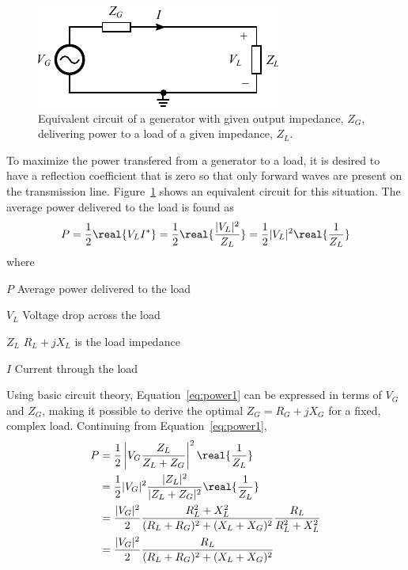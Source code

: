 \begin{figure}[htbp]
    \centering
    \includegraphics{img/analysis/generator_load}
    \caption{Equivalent circuit of a generator with given output impedance, $Z_G$, delivering power to a load of a given impedance, $Z_L$.}
    \label{fig:generator_load}
\end{figure}

To maximize the power transfered from a generator to a load, it is desired to have a reflection coefficient that is zero so that only forward waves are present on the transmission line. Figure~\ref{fig:generator_load} shows an equivalent circuit for this situation. The average power delivered to the load is found as \cite{pozar2011microwave}
\begin{equation}
    \label{eq:power1}
    P = \frac{1}{2} \real{V_LI^*} = \frac{1}{2} \real{\frac{|V_L|^2}{Z_L}}
    = \frac{1}{2} |V_L|^2 \real{\frac{1}{Z_L}}
\end{equation}
where
\begin{where}
\item[$P$] Average power delivered to the load
\item[$V_L$] Voltage drop across the load
\item[$Z_L$] $R_L+jX_L$ is the load impedance
\item[$I$] Current through the load
\end{where}
Using basic circuit theory, Equation~\ref{eq:power1} can be expressed in terms of $V_G$ and $Z_G$, making it possible to derive the optimal $Z_G = R_G+jX_G$ for a fixed, complex load. Continuing from Equation~\ref{eq:power1},
\begin{equation}
    \begin{aligned}
        P &= \frac{1}{2} \left| V_G \frac{Z_L}{Z_L+Z_G} \right|^2 \real{\frac{1}{Z_L}} \\
        &= \frac{1}{2} |V_G|^2 \frac{|Z_L|^2}{|Z_L+Z_G|^2} \real{\frac{1}{Z_L}}\\
        &= \frac{|V_G|^2}{2} \frac{R_L^2+X_L^2}{(R_L+R_G)^2+(X_L+X_G)^2} \frac{R_L}{R_L^2 + X_L^2}\\
        &= \frac{|V_G|^2}{2} \frac{R_L}{(R_L+R_G)^2 + (X_L+X_G)^2}
    \end{aligned}
\end{equation}
